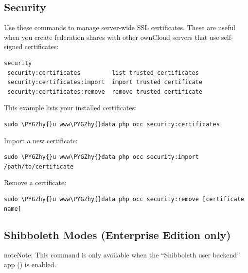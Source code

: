 \documentclass[letterpaper,10pt,english]{sphinxmanual}
\def\PYGZhy{\char`\-}
\begin{document}
\subsection{Security}
\label{configuration_server/occ_command:security}\label{configuration_server/occ_command:security-commands-label}
Use these commands to manage server-wide SSL certificates. These are useful when you create federation shares with other ownCloud servers that use self-signed certificates:

\begin{Verbatim}[commandchars=\\\{\}]
security
 security:certificates         list trusted certificates
 security:certificates:import  import trusted certificate
 security:certificates:remove  remove trusted certificate
\end{Verbatim}

This example lists your installed certificates:

\begin{Verbatim}[commandchars=\\\{\}]
sudo \PYGZhy{}u www\PYGZhy{}data php occ security:certificates
\end{Verbatim}

Import a new certificate:

\begin{Verbatim}[commandchars=\\\{\}]
sudo \PYGZhy{}u www\PYGZhy{}data php occ security:import /path/to/certificate
\end{Verbatim}

Remove a certificate:

\begin{Verbatim}[commandchars=\\\{\}]
sudo \PYGZhy{}u www\PYGZhy{}data php occ security:remove [certificate name]
\end{Verbatim}


\subsection{Shibboleth Modes (Enterprise Edition only)}
\label{configuration_server/occ_command:shibboleth-modes-enterprise-edition-only}\label{configuration_server/occ_command:shibboleth-label}
\begin{notice}{note}{Note:}
This command is only available when the ``Shibboleth user backend'' app
() is enabled.
\end{notice}
\end{document}
